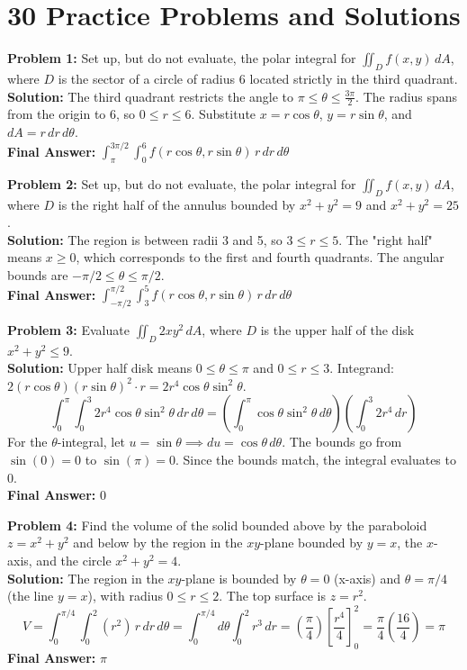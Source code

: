 \documentclass[11pt]{article}
\begin{document}
\newpage
\section*{30 Practice Problems and Solutions}

\textbf{Problem 1:} Set up, but do not evaluate, the polar integral for $\iint_D f(x,y) \, dA$, where $D$ is the sector of a circle of radius 6 located strictly in the third quadrant.
\\
\textbf{Solution:} 
The third quadrant restricts the angle to $\pi \le \theta \le \frac{3\pi}{2}$. The radius spans from the origin to 6, so $0 \le r \le 6$. 
Substitute $x = r\cos\theta$, $y = r\sin\theta$, and $dA = r \, dr \, d\theta$.
\\
\textbf{Final Answer:} $\int_{\pi}^{3\pi/2} \int_0^6 f(r\cos\theta, r\sin\theta) \, r \, dr \, d\theta$

\vspace{0.5cm}
\textbf{Problem 2:} Set up, but do not evaluate, the polar integral for $\iint_D f(x,y) \, dA$, where $D$ is the right half of the annulus bounded by $x^2+y^2=9$ and $x^2+y^2=25$.
\\
\textbf{Solution:}
The region is between radii 3 and 5, so $3 \le r \le 5$. The "right half" means $x \ge 0$, which corresponds to the first and fourth quadrants. The angular bounds are $-\pi/2 \le \theta \le \pi/2$.
\\
\textbf{Final Answer:} $\int_{-\pi/2}^{\pi/2} \int_3^5 f(r\cos\theta, r\sin\theta) \, r \, dr \, d\theta$

\vspace{0.5cm}
\textbf{Problem 3:} Evaluate $\iint_D 2xy^2 \, dA$, where $D$ is the upper half of the disk $x^2+y^2 \le 9$.
\\
\textbf{Solution:}
Upper half disk means $0 \le \theta \le \pi$ and $0 \le r \le 3$. 
Integrand: $2(r\cos\theta)(r\sin\theta)^2 \cdot r = 2r^4\cos\theta\sin^2\theta$.
$$ \int_0^\pi \int_0^3 2r^4\cos\theta\sin^2\theta \, dr \, d\theta = \left( \int_0^\pi \cos\theta\sin^2\theta \, d\theta \right) \left( \int_0^3 2r^4 \, dr \right) $$
For the $\theta$-integral, let $u = \sin\theta \implies du = \cos\theta \, d\theta$. The bounds go from $\sin(0)=0$ to $\sin(\pi)=0$. Since the bounds match, the integral evaluates to 0. 
\\
\textbf{Final Answer:} $0$

\vspace{0.5cm}
\textbf{Problem 4:} Find the volume of the solid bounded above by the paraboloid $z = x^2+y^2$ and below by the region in the $xy$-plane bounded by $y=x$, the $x$-axis, and the circle $x^2+y^2=4$.
\\
\textbf{Solution:}
The region in the $xy$-plane is bounded by $\theta = 0$ (x-axis) and $\theta = \pi/4$ (the line $y=x$), with radius $0 \le r \le 2$. The top surface is $z = r^2$.
$$ V = \int_0^{\pi/4} \int_0^2 (r^2) \, r \, dr \, d\theta = \int_0^{\pi/4} d\theta \int_0^2 r^3 \, dr = \left( \frac{\pi}{4} \right) \left[ \frac{r^4}{4} \right]_0^2 = \frac{\pi}{4} \left( \frac{16}{4} \right) = \pi $$
\textbf{Final Answer:} $\pi$
\end{document}
